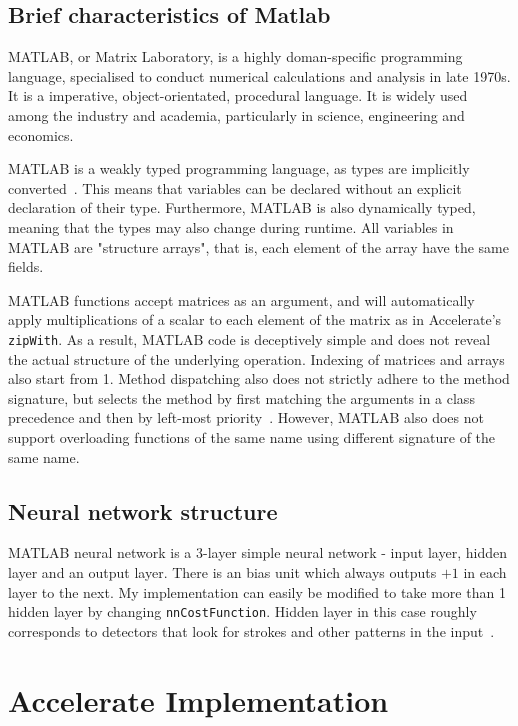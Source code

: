 \subsection{Brief characteristics of Matlab} \label{se:impl.matlab.background}

MATLAB, or Matrix Laboratory, is a highly doman-specific programming language, specialised to conduct numerical calculations and analysis in late 1970s. It is a imperative, object-orientated, procedural language. It is widely used among the industry and academia, particularly in science, engineering and economics.

MATLAB is a weakly typed programming language, as types are implicitly converted~\cite{Wiki1}. This means that variables can be declared without an explicit declaration of their type. Furthermore, MATLAB is also dynamically typed, meaning that the types may also change during runtime. All variables in MATLAB are "structure arrays", that is, each element of the array have the same fields. 

MATLAB functions accept matrices as an argument, and will automatically apply multiplications of a scalar to each element of the matrix as in Accelerate's \texttt{zipWith}. As a result, MATLAB code is deceptively simple and does not reveal the actual structure of the underlying operation. Indexing of matrices and arrays also start from 1. Method dispatching also does not strictly adhere to the method signature, but selects the method by first matching the arguments in a class precedence and then by left-most priority~\cite{Mat17}. However, MATLAB also does not support overloading functions of the same name using different signature of the same name.

\subsection{Neural network structure} \label{se:impl.matlab.structure}

MATLAB neural network is a 3-layer simple neural network - input layer, hidden layer and an output layer. There is an bias unit which always outputs $+1$ in each layer to the next. My implementation can easily be modified to take more than 1 hidden layer by changing \texttt{nnCostFunction}. Hidden layer in this case roughly corresponds to detectors that look for strokes and other patterns in the input~\cite{Ng12}.

\section{Accelerate Implementation} \label{se:impl.acc}

